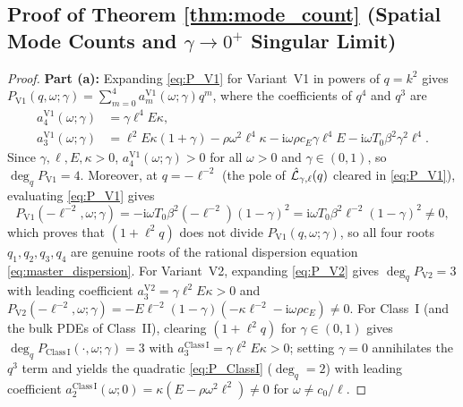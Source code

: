 \subsection{Proof of Theorem \ref{thm:mode_count} (Spatial Mode Counts and $\gamma \to 0^+$ Singular Limit)}\label{app:proof_thm2}

\begin{proof}
\textbf{Part (a):} Expanding \eqref{eq:P_V1} for Variant~V1 in powers of $q = k^2$ gives $P_{\mathrm{V1}}(q,\omega;\gamma) = \sum_{m=0}^4 a_m^{\mathrm{V1}}(\omega;\gamma)q^m$, where the coefficients of $q^4$ and $q^3$ are
\begin{align}
  a_4^{\mathrm{V1}}(\omega;\gamma) &= \gamma\ell^4 E\kappa, \label{eq:app_a4_V1}\\
  a_3^{\mathrm{V1}}(\omega;\gamma) &= \ell^2 E\kappa(1+\gamma) - \rho\omega^2\ell^4\kappa - \mathrm{i}\omega\rho c_E\gamma\ell^4 E - \mathrm{i}\omega T_0\beta^2\gamma^2\ell^4. \label{eq:app_a3_V1}
\end{align}
Since $\gamma, \ell, E, \kappa > 0$, $a_4^{\mathrm{V1}}(\omega;\gamma) > 0$ for all $\omega > 0$ and $\gamma \in (0,1)$, so $\deg_q P_{\mathrm{V1}} = 4$. Moreover, at $q = -\ell^{-2}$ (the pole of $\hat{\mathcal{L}}_{\gamma,\ell}(q)$ cleared in \eqref{eq:P_V1}), evaluating \eqref{eq:P_V1} gives
\begin{equation}\label{eq:app_no_cancellation}
  P_{\mathrm{V1}}(-\ell^{-2},\omega;\gamma) = -\mathrm{i}\omega T_0\beta^2(-\ell^{-2})(1-\gamma)^2 = \mathrm{i}\omega T_0\beta^2\ell^{-2}(1-\gamma)^2 \neq 0,
\end{equation}
which proves that $(1+\ell^2 q)$ does not divide $P_{\mathrm{V1}}(q,\omega;\gamma)$, so all four roots $q_1,q_2,q_3,q_4$ are genuine roots of the rational dispersion equation \eqref{eq:master_dispersion}. For Variant~V2, expanding \eqref{eq:P_V2} gives $\deg_q P_{\mathrm{V2}} = 3$ with leading coefficient $a_3^{\mathrm{V2}} = \gamma\ell^2 E\kappa > 0$ and $P_{\mathrm{V2}}(-\ell^{-2},\omega;\gamma) = -E\ell^{-2}(1-\gamma)(-\kappa\ell^{-2} - \mathrm{i}\omega\rho c_E) \neq 0$. For Class~I (and the bulk PDEs of Class~II), clearing $(1+\ell^2 q)$ for $\gamma \in (0,1)$ gives $\deg_q P_{\mathrm{Class\,I}}(\cdot,\omega;\gamma) = 3$ with $a_3^{\mathrm{Class\,I}} = \gamma\ell^2 E\kappa > 0$; setting $\gamma = 0$ annihilates the $q^3$ term and yields the quadratic \eqref{eq:P_ClassI} ($\deg_q = 2$) with leading coefficient $a_2^{\mathrm{Class\,I}}(\omega;0) = \kappa(E - \rho\omega^2\ell^2) \neq 0$ for $\omega \neq c_0/\ell$.


\end{proof}
